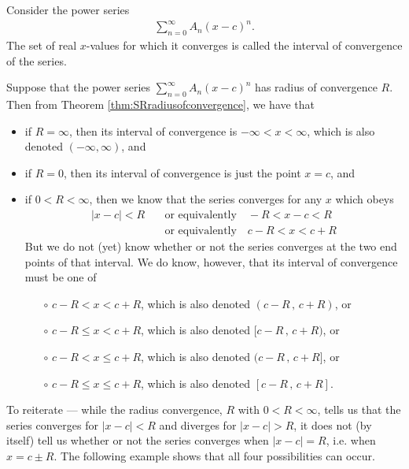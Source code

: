 \begin{defn}\label{def:SRintervalofconvergence}
Consider the power series
\begin{align*}
  \sum_{n=0}^\infty A_n (x-c)^n.
\end{align*}
The set of real $x$-values for which it converges is called the interval
of convergence of the series.
\end{defn}
Suppose that the power series $\sum\limits_{n=0}^\infty A_n (x-c)^n$
has radius of  convergence $R$. Then from
Theorem \ref{thm:SRradiusofconvergence}, we have that
\begin{itemize}
\item
if $R=\infty$, then its interval of convergence is $-\infty<x<\infty$,
which is also denoted $(-\infty,\infty)$,
and
\item
if $R=0$, then its interval of convergence is just the point $x=c$, and

\item if $0<R<\infty$, then we know that the series converges for any $x$
which obeys
\begin{align*}
|x-c|<R\quad&\text{or equivalently}\quad -R<x-c<R \\
   &\text{or equivalently}\quad c-R<x<c+R
\end{align*}
But we do not (yet) know whether or not the series converges at the
two end points of that interval. We do know, however, that its interval
of convergence must be one of
\begin{itemize}
\item[$\circ$]
$c-R<x<c+R$, which is also denoted $(c-R\,,\,c+R)$,  or
\item[$\circ$]
$c-R\le x<c+R$, which is also denoted $[c-R\,,\,c+R)$,  or
\item[$\circ$]
$c-R<x\le c+R$, which is also denoted $(c-R\,,\,c+R]$,  or
\item[$\circ$]
$c-R\le x \le c+R$, which is also denoted $[c-R\,,\,c+R]$.
\end{itemize}
\end{itemize}
To reiterate --- while the radius convergence, $R$ with $0<R<\infty$, tells
us that the series converges for $|x-c|<R$ and diverges for $|x-c|>R$,
it does not (by itself) tell us whether or not the series converges when
$|x-c|=R$, i.e. when $x=c\pm R$. The following example shows that all four
possibilities can occur.

